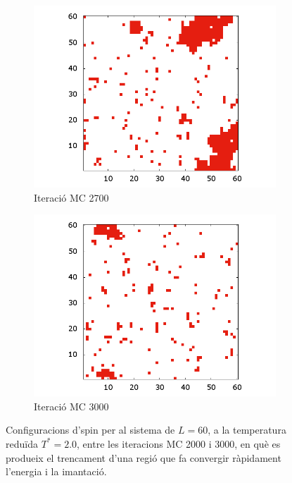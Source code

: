 \documentclass[a4paper]{article}
\begin{document}
\begin{figure}[H]
\begin{subfigure}{.24\textwidth}
        \centering
        \includegraphics[width=\textwidth]{SIM-L-060-TEMP-2000_56-CEVO.png}
        \caption{Iteració MC 2700}
        \label{fig:conf_2k7}
    \end{subfigure}
    \begin{subfigure}{.24\textwidth}
        \centering
        \includegraphics[width=\textwidth]{SIM-L-060-TEMP-2000_60-CEVO.png}
        \caption{Iteració MC 3000}
        \label{fig:conf_3k}
    \end{subfigure}
    \caption{Configuracions d'spin per al sistema de $L=60$, a la temperatura reduïda $T^*=2.0$, entre les iteracions MC 2000 i 3000, en què es produeix el trencament d'una regió que fa convergir ràpidament l'energia i la imantació.}
\label{fig:conf_zoom}
\end{figure}
\end{document}
